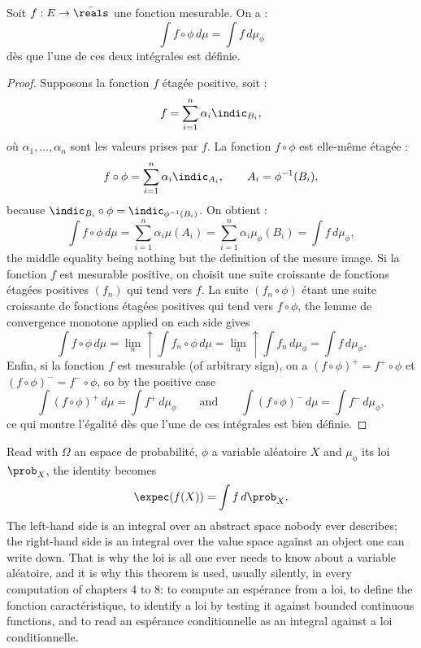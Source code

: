 \medskip

\begin{theorem}[Transfert]
  Soit $f : E \to \bar{\reals}$ une fonction mesurable. On a :
  \[
    \int f \circ \phi \, d\mu = \int f \, d\mu_{\phi}
  \]
  dès que l'une de ces deux intégrales est définie.
\end{theorem}

\begin{proof}
  Supposons la fonction $f$ étagée positive, soit :
  \[
    f = \sum_{i=1}^{n} \alpha_{i} \indic_{B_{i}} ,
  \]
  où $\alpha_{1},\ldots,\alpha_{n}$ sont les valeurs prises par $f$. La fonction $f
  \circ \phi$ est elle-même étagée :
  \[
    f \circ \phi = \sum_{i=1}^{n} \alpha_{i} \indic_{A_{i}} ,
    \qquad A_{i} = \phi^{-1}(B_{i}) ,
  \]
  because $\indic_{B_{i}} \circ \phi = \indic_{\phi^{-1}(B_{i})}$. On obtient :
  \[
    \int f \circ \phi \, d\mu = \sum_{i=1}^{n} \alpha_{i} \mu(A_{i})
    = \sum_{i=1}^{n} \alpha_{i} \mu_{\phi}(B_{i}) = \int f \, d\mu_{\phi} ,
  \]
  the middle equality being nothing but the definition of the mesure image. Si la
  fonction $f$ est mesurable positive, on choisit une suite croissante de fonctions
  étagées positives $(f_{n})$ qui tend vers $f$. La suite $(f_{n} \circ \phi)$ étant
  une suite croissante de fonctions étagées positives qui tend vers $f \circ \phi$,
  the lemme de convergence monotone applied on each side gives
  \[
    \int f \circ \phi \, d\mu = \lim_{n} \uparrow \int f_{n} \circ \phi \, d\mu
    = \lim_{n} \uparrow \int f_{n} \, d\mu_{\phi} = \int f \, d\mu_{\phi} .
  \]
  Enfin, si la fonction $f$ est mesurable (of arbitrary sign), on a $(f \circ
  \phi)^{+} = f^{+} \circ \phi$ et $(f \circ \phi)^{-} = f^{-} \circ \phi$, so by the
  positive case
  \[
    \int (f \circ \phi)^{+} \, d\mu = \int f^{+} \, d\mu_{\phi}
    \qquad \text{and} \qquad
    \int (f \circ \phi)^{-} \, d\mu = \int f^{-} \, d\mu_{\phi} ,
  \]
  ce qui montre l'égalité dès que l'une de ces intégrales est bien définie.
\end{proof}

\begin{remark}
  Read with $\Omega$ an espace de probabilité, $\phi$ a variable aléatoire $X$ and
  $\mu_{\phi}$ its loi $\prob_{X}$, the identity becomes
  \[
    \expec(f(X)) = \int f \, d\prob_{X} .
  \]
  The left-hand side is an integral over an abstract space nobody ever describes; the
  right-hand side is an integral over the value space against an object one can write
  down. That is why the loi is all one ever needs to know about a variable aléatoire,
  and it is why this theorem is used, usually silently, in every computation of
  chapters 4 to 8: to compute an espérance from a loi, to define the fonction
  caractéristique, to identify a loi by testing it against bounded continuous
  functions, and to read an espérance conditionnelle as an integral against a loi
  conditionnelle.
\end{remark}

